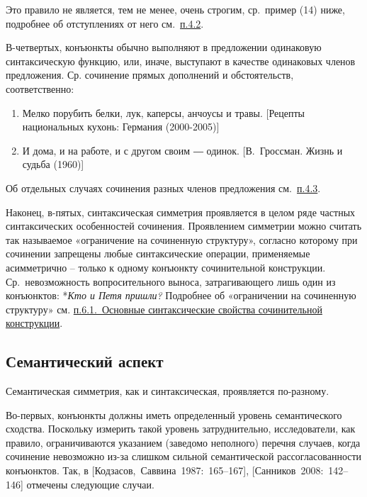 Это правило не является, тем не менее, очень строгим, ср.~пример (14)
ниже, подробнее об отступлениях от него см.~\underline{п.4.2}.

В-четвертых, конъюнкты обычно выполняют в предложении одинаковую
синтаксическую функцию, или, иначе, выступают в качестве одинаковых
членов предложения. Ср. сочинение прямых дополнений и обстоятельств,
соответственно:

\begin{enumerate}
\def\labelenumi{(\arabic{enumi})}
\setcounter{enumi}{12}
\item
  Мелко порубить белки, лук, каперсы, анчоусы и травы. {[}Рецепты
  национальных кухонь: Германия (2000-2005){]}
\item
  И дома, и на работе, и с другом своим ― одинок. {[}В.~Гроссман. Жизнь
  и судьба (1960){]}
\end{enumerate}

Об отдельных случаях сочинения разных членов предложения
см.~\underline{п.4.3}.

Наконец, в-пятых, синтаксическая симметрия проявляется в целом ряде
частных синтаксических особенностей сочинения. Проявлением симметрии
можно считать так называемое «ограничение на сочиненную структуру»,
согласно которому при сочинении запрещены любые синтаксические операции,
применяемые асимметрично -- только к одному конъюнкту сочинительной
конструкции. Ср.~невозможность вопросительного выноса, затрагивающего
лишь один из конъюнктов: *\emph{Кто и Петя пришли?} Подробнее об
«ограничении на сочиненную структуру» см. \underline{п.6.1.~Основные
синтаксические свойства сочинительной конструкции}.

\hypertarget{ux441ux435ux43cux430ux43dux442ux438ux447ux435ux441ux43aux438ux439-ux430ux441ux43fux435ux43aux442}{%
\subsection{Семантический
аспект}\label{ux441ux435ux43cux430ux43dux442ux438ux447ux435ux441ux43aux438ux439-ux430ux441ux43fux435ux43aux442}}

Семантическая симметрия, как и синтаксическая, проявляется по-разному.

Во-первых, конъюнкты должны иметь определенный уровень семантического
сходства. Поскольку измерить такой уровень затруднительно,
исследователи, как правило, ограничиваются указанием (заведомо
неполного) перечня случаев, когда сочинение невозможно из-за слишком
сильной семантической рассогласованности конъюнктов. Так, в
{[}Кодзасов,~Саввина~1987:~165--167{]}, {[}Санников~2008:~142--146{]}
отмечены следующие случаи.

